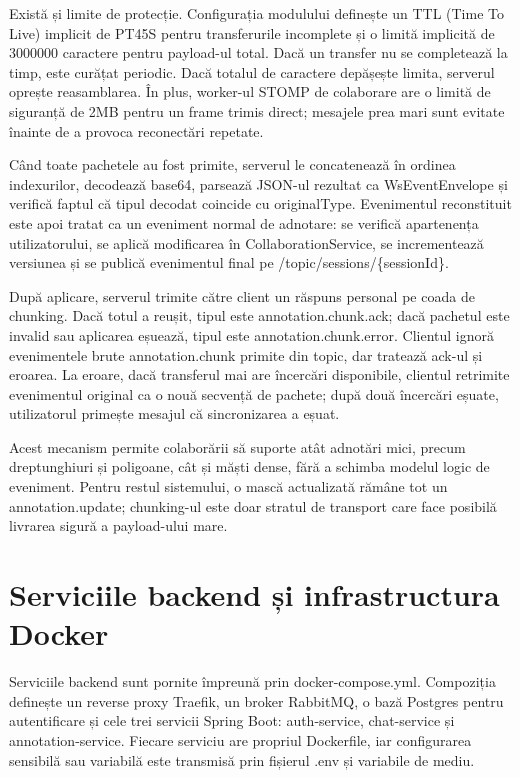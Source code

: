 Există și limite de protecție. Configurația modulului definește un TTL (Time To Live) implicit de PT45S pentru transferurile incomplete și o limită implicită de 3000000 caractere pentru payload-ul total. Dacă un transfer nu se completează la timp, este curățat periodic. Dacă totalul de caractere depășește limita, serverul oprește reasamblarea. În plus, worker-ul STOMP de colaborare are o limită de siguranță de 2MB pentru un frame trimis direct; mesajele prea mari sunt evitate înainte de a provoca reconectări repetate.

Când toate pachetele au fost primite, serverul le concatenează în ordinea indexurilor, decodează base64, parsează JSON-ul rezultat ca WsEventEnvelope și verifică faptul că tipul decodat coincide cu originalType. Evenimentul reconstituit este apoi tratat ca un eveniment normal de adnotare: se verifică apartenența utilizatorului, se aplică modificarea în CollaborationService, se incrementează versiunea și se publică evenimentul final pe /topic/sessions/\{sessionId\}.

După aplicare, serverul trimite către client un răspuns personal pe coada de chunking. Dacă totul a reușit, tipul este annotation.chunk.ack; dacă pachetul este invalid sau aplicarea eșuează, tipul este annotation.chunk.error. Clientul ignoră evenimentele brute annotation.chunk primite din topic, dar tratează ack-ul și eroarea. La eroare, dacă transferul mai are încercări disponibile, clientul retrimite evenimentul original ca o nouă secvență de pachete; după două încercări eșuate, utilizatorul primește mesajul că sincronizarea a eșuat.

Acest mecanism permite colaborării să suporte atât adnotări mici, precum dreptunghiuri și poligoane, cât și măști dense, fără a schimba modelul logic de eveniment. Pentru restul sistemului, o mască actualizată rămâne tot un annotation.update; chunking-ul este doar stratul de transport care face posibilă livrarea sigură a payload-ului mare.

\section{Serviciile backend și infrastructura Docker}

Serviciile backend sunt pornite împreună prin docker-compose.yml. Compoziția definește un reverse proxy Traefik, un broker RabbitMQ, o bază Postgres pentru autentificare și cele trei servicii Spring Boot: auth-service, chat-service și annotation-service. Fiecare serviciu are propriul Dockerfile, iar configurarea sensibilă sau variabilă este transmisă prin fișierul .env și variabile de mediu.


